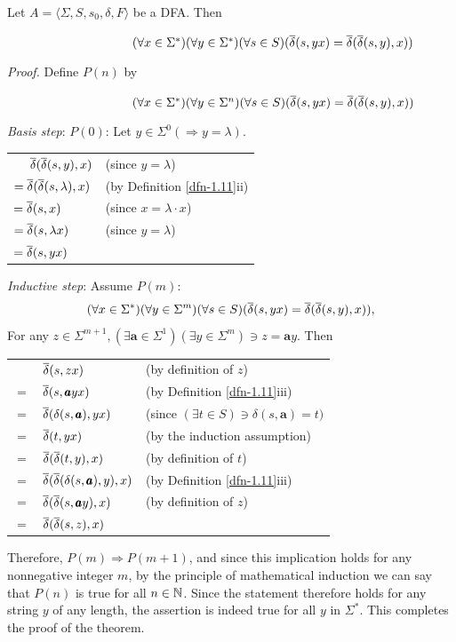 \begin{thm}\label{thm-1.1}
Let $A =\langle\Sigma,S,s_0,\delta,F\rangle$ be a DFA. Then

\ \ \ \ \ \ \ \ \ \ \ \ \ \ \ \ \ \ \ \ 
$(\forall x \in \Sigma^*)(\forall y \in \Sigma^*)(\forall s \in S)
(\overline{\delta}(s,yx) = \overline{\delta}(\overline{\delta}(s,y),x))$

\emph{Proof.} Define $P(n)$ by

\ \ \ \ \ \ \ \ \ \ \ \ \ \ \ \ \ \ \ \ 
$(\forall x \in \Sigma^*)(\forall y \in \Sigma^n)(\forall s \in S)
(\overline{\delta}(s,yx) = \overline{\delta}(\overline{\delta}(s,y),x))$

\emph{Basis step}: $P(0)$: Let $y \in \Sigma^0 (\Rightarrow y = \lambda)$.
\begin{center}\begin{tabular}{l@{$\qquad$}l}
$\ \ \ \ \DBAR(\DBAR(s,y),x)$ & (since $y=\lambda$) \\
$=\overline{\delta}(\overline{\delta}(s,\lambda),x)$ & (by Definition \ref{dfn-1.11}ii)\\
$=\overline{\delta}(s,x)$ & (since $x=\lambda\cdot x$) \\
$=\overline{\delta}(s,\lambda x)$ & (since $y=\lambda$) \\
$=\overline{\delta}(s,yx)$
\end{tabular}\end{center}

\emph{Inductive step}: Assume $P(m)$:
\[ (\forall x \in \Sigma^*)(\forall y \in \Sigma^m)(\forall s \in S)
	(\overline{\delta}(s,yx) = \overline{\delta}(\overline{\delta}(s,y),x)), \]
For any $z \in \Sigma^{m+1},(\exists \pmb{a} \in \Sigma^1)(\exists y \in
\Sigma^m) \ni z = \pmb{a}y$. Then
\begin{center}\begin{tabular}{r@{ }l@{$\qquad$}l}
& $\overline{\delta}(s,zx)$ & (by definition of $z$) \\
$=$ & $\overline{\delta}(s,\pmb{a}yx)$ & (by Definition \ref{dfn-1.11}iii) \\ 
$=$ & $\overline{\delta}(\delta(s,\pmb{a}),yx)$ & (since $(\exists t\in S)\ni\delta(s,
	\pmb{a})=t)$ \\
$=$ & $\overline{\delta}(t,yx)$ & (by the induction assumption) \\
$=$ & $\overline{\delta}(\overline{\delta}(t,y),x)$ & (by definition of $t$) \\ 
$=$ & $\overline{\delta}(\overline{\delta}(\delta(s,\pmb{a}),y),x)$ & (by Definition \ref{dfn-1.11}iii) \\
$=$ & $\overline{\delta}(\overline{\delta}(s,\pmb{a}y),x)$ & (by definition of $z$) \\
$=$ & $\overline{\delta}(\overline{\delta}(s,z),x)$ \\
\end{tabular}\end{center}
Therefore, $P(m)\Rightarrow P(m+1)$, and since this implication holds for any
nonnegative integer $m$, by the principle of mathematical induction we can say
that $P(n)$ is true for all $n \in \mathbb{N}$. Since the statement therefore holds for
any string $y$ of any length, the assertion is indeed true for all $y$ in
$\Sigma^*$. This completes the proof of the theorem.
\end{thm}


